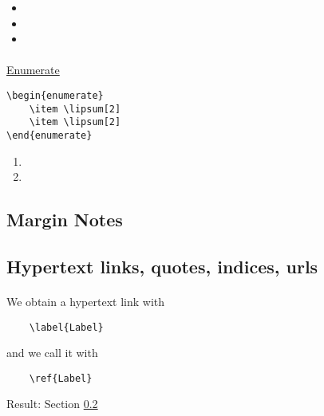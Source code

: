 \begin{itemize}
    \item \lipsum[2]
    \item \lipsum[2]
    \item \lipsum[2]
\end{itemize}

\paragraph*{} \underline{Enumerate}
\begin{verbatim}
\begin{enumerate}
    \item \lipsum[2]
    \item \lipsum[2]
\end{enumerate}
\end{verbatim}

\begin{enumerate}
    \item \lipsum[2]
    \item \lipsum[2]
\end{enumerate}





\subsection{Margin Notes}
	\lipsum[2]
	\begin{Rmk}{}{}
    \lipsum[2]
    \lipsum[2]
    \end{Rmk}
	\lipsum[2]
    \begin{Proof}
    \lipsum[2]
    \sub
	\lipsum[2]
    \end{Proof}

\subsection{Hypertext links, quotes, indices, urls}\label{Label}
\paragraph*{}
We obtain a hypertext link with
\begin{verbatim}
    \label{Label}
\end{verbatim}
\noindent and we call it with
\begin{verbatim}
    \ref{Label}
\end{verbatim}
Result: Section \ref{Label}

